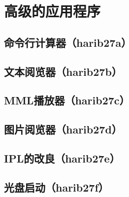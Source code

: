 ﻿\chapter{	高级的应用程序	}
\section{	命令行计算器（harib27a）	}
\section{	文本阅览器（harib27b）	}
\section{	MML播放器（harib27c）	}
\section{	图片阅览器（harib27d）	}
\section{	IPL的改良（harib27e）	}
\section{	光盘启动（harib27f）	}

